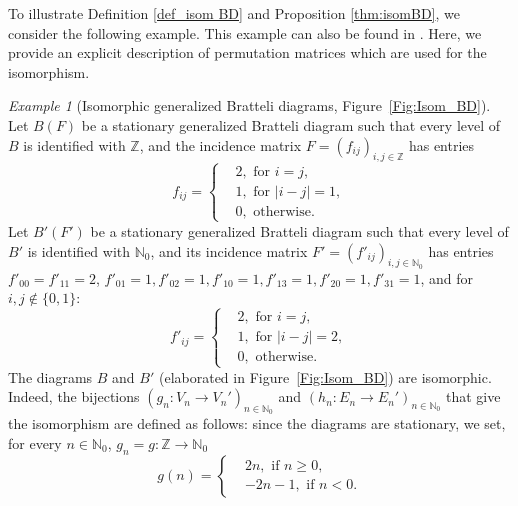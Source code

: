 \documentclass[11pt, twoside]{amsart}
\theoremstyle{definition}
\theoremstyle{remark}
\newtheorem{example}[definition]{Example}
\theoremstyle{plain}
\newcommand{\N}{\mathbb N}
\newcommand{\Z}{\mathbb Z}
\numberwithin{equation}{section}
\begin{document}
To illustrate Definition \ref{def_isom BD} and Proposition \ref{thm:isomBD}, we consider the following example. This example can also be found in \cite[Example 2.9]{BezuglyiJorgensenKarpelSanadhya2025}. Here, we provide an explicit description of permutation matrices which are used for the isomorphism.






\begin{example}[Isomorphic generalized Bratteli 
diagrams, Figure~\ref{Fig:Isom_BD}]\label{Ex:isom_bd}
Let $B(F)$ be a stationary generalized Bratteli diagram such that 
every level of $B$ is identified with $\Z$, and the incidence 
matrix $F = (f_{ij})_{i,j \in \Z}$ has entries
$$
f_{ij} = 
\left\{
\begin{aligned}
& 2, \mbox{ for } i = j,\\
& 1, \mbox{ for } |i - j| = 1,\\
& 0, \mbox{ otherwise. }
\end{aligned}
\right.
$$ 
Let $B'(F')$ be a stationary generalized Bratteli 
diagram such that every level of $B'$ is identified with $\N_0$, 
and its incidence matrix $F' = (f'_{ij})_{i,j \in \N_{0}}$ has 
entries $f'_{00} = f'_{11} = 2$, $f'_{01} = 1, f'_{02} = 1, f'_{10} = 1, f'_{13} = 1, f'_{20} = 1, f'_{31} = 1$,
and for $i,j \notin \{0,1\}$: 
$$
f'_{ij} = 
\left\{
\begin{aligned}
& 2, \mbox{ for } i = j,\\
& 1, \mbox{ for } |i - j| = 2,\\
& 0, \mbox{ otherwise. }
\end{aligned}
\right.
$$ 
The diagrams $B$ and $B'$ (elaborated in 
Figure~\ref{Fig:Isom_BD}) are isomorphic. Indeed, the bijections 
$(g_n : V_n \rightarrow V_n')_{n \in \N_0}$ and $(h_n : E_n 
\rightarrow E_n')_{n \in \N_0}$ that give the isomorphism are 
defined as follows: since the diagrams are stationary, we set,
for every $n \in \N_0$, $g_n = g : \mathbb{Z} \rightarrow 
\mathbb{N}_0$ 
$$
g (n) = 
\left\{
\begin{aligned}
&2n, \mbox{ if } n \geq 0,\\
&- 2n - 1, \mbox{ if } n < 0.
\end{aligned}
$$
\end{example}
\end{document}
